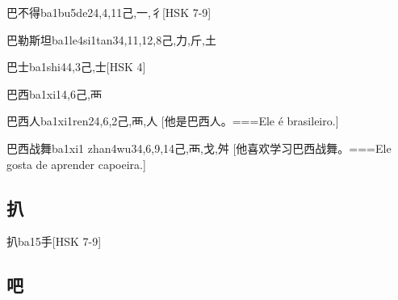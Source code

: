 \begin{EntryWithPhonetic}{巴不得}{ba1bu5de2}{4,4,11}{⼰,⼀,⼻}[HSK 7-9]
\end{EntryWithPhonetic}

\begin{EntryWithPhonetic}{巴勒斯坦}{ba1le4si1tan3}{4,11,12,8}{⼰,⼒,⽄,⼟}
\end{EntryWithPhonetic}

\begin{EntryWithPhonetic}{巴士}{ba1shi4}{4,3}{⼰,⼠}[HSK 4]
\end{EntryWithPhonetic}

\begin{EntryWithPhonetic}{巴西}{ba1xi1}{4,6}{⼰,⾑}
\end{EntryWithPhonetic}

\begin{EntryWithPhonetic}{巴西人}{ba1xi1ren2}{4,6,2}{⼰,⾑,⼈}
  [他是巴西人。===Ele é brasileiro.]
\end{EntryWithPhonetic}

\begin{EntryWithPhonetic}{巴西战舞}{ba1xi1 zhan4wu3}{4,6,9,14}{⼰,⾑,⼽,⾇}
  [他喜欢学习巴西战舞。===Ele gosta de aprender capoeira.]
\end{EntryWithPhonetic}

\subsection*{扒}

\begin{EntryWithPhonetic}{扒}{ba1}{5}{⼿}[HSK 7-9]
\end{EntryWithPhonetic}

\subsection*{吧}

